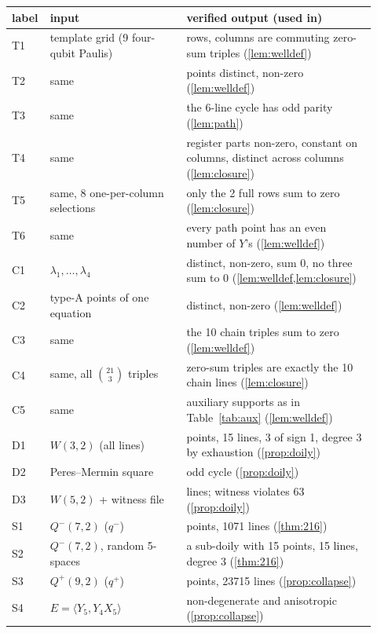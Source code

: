 \documentclass[a4paper,onecolumn,11pt,unpublished,nopdfoutputerror]{quantumarticle}
\theoremstyle{definition}
\newcommand{\W}[1]{W(#1,2)}
\newcommand{\Qp}[1]{Q^{+}(#1,2)}
\newcommand{\Qm}[1]{Q^{-}(#1,2)}
\begin{document}
{\small
\renewcommand{\arraystretch}{1.1}
\begin{longtable}{@{}>{\raggedright\arraybackslash}p{0.06\linewidth}>{\raggedright\arraybackslash}p{0.36\linewidth}>{\raggedright\arraybackslash}p{0.5\linewidth}@{}}
\toprule
label & input & verified output (used in)\\\midrule
T1 & template grid (9 four-qubit Paulis) & rows, columns are commuting zero-sum triples (\cref{lem:welldef})\\
T2 & same & 9 points distinct, non-zero (\cref{lem:welldef})\\
T3 & same & the 6-line cycle has odd parity (\cref{lem:path})\\
T4 & same & register parts non-zero, constant on columns, distinct across columns (\cref{lem:closure})\\
T5 & same, 8 one-per-column selections & only the 2 full rows sum to zero (\cref{lem:closure})\\
T6 & same & every path point has an even number of $Y$'s (\cref{lem:welldef})\\
C1 & $\lambda_1,\dots,\lambda_4$ & distinct, non-zero, sum $0$, no three sum to $0$ (\cref{lem:welldef,lem:closure})\\
C2 & 21 type-A points of one equation & distinct, non-zero (\cref{lem:welldef})\\
C3 & same & the 10 chain triples sum to zero (\cref{lem:welldef})\\
C4 & same, all $\binom{21}{3}$ triples & zero-sum triples are exactly the 10 chain lines (\cref{lem:closure})\\
C5 & same & auxiliary supports as in Table~\ref{tab:aux} (\cref{lem:welldef})\\
D1 & $\W3$ (all lines) & 15 points, 15 lines, 3 of sign 1, degree 3 by exhaustion (\cref{prop:doily})\\
D2 & Peres--Mermin square & odd cycle (\cref{prop:doily})\\
D3 & $\W5$ + witness file & 315 lines; witness violates 63 (\cref{prop:doily})\\
S1 & $\Qm7$ ($q^-$) & 119 points, 1071 lines (\cref{thm:216})\\
S2 & $\Qm7$, random 5-spaces & a sub-doily with 15 points, 15 lines, degree 3 (\cref{thm:216})\\
S3 & $\Qp9$ ($q^+$) & 527 points, 23715 lines (\cref{prop:collapse})\\
S4 & $E=\langle Y_5,Y_4X_5\rangle$ & non-degenerate and anisotropic (\cref{prop:collapse})\\

\end{longtable}}
\end{document}

